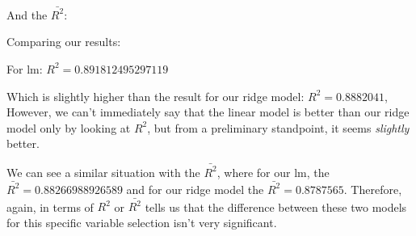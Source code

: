 \documentclass[]{article}
\newenvironment{Shaded}{\begin{snugshade}}{\end{snugshade}}
\newcommand{\CommentTok}[1]{\textcolor[rgb]{0.56,0.35,0.01}{\textit{#1}}}
\newcommand{\DecValTok}[1]{\textcolor[rgb]{0.00,0.00,0.81}{#1}}
\newcommand{\KeywordTok}[1]{\textcolor[rgb]{0.13,0.29,0.53}{\textbf{#1}}}
\newcommand{\NormalTok}[1]{#1}
\newcommand{\OperatorTok}[1]{\textcolor[rgb]{0.81,0.36,0.00}{\textbf{#1}}}
\newcommand{\StringTok}[1]{\textcolor[rgb]{0.31,0.60,0.02}{#1}}
\begin{document}
{And the \(\bar{R^2}\):

\begin{Shaded}
\end{Shaded}

Comparing our results:

For lm: \(R^2 = 0.891812495297119\)

Which is slightly higher than the result for our ridge model:
\(R^2 = 0.8882041\), However, we can't immediately say that the linear
model is better than our ridge model only by looking at \(R^2\), but
from a preliminary standpoint, it seems \emph{slightly} better.

We can see a similar situation with the \(\bar{R^2}\), where for our lm,
the \(\bar{R^2} = 0.88266988926589\) and for our ridge model the
\(\bar{R^2} = 0.8787565\). Therefore, again, in terms of \(R^2\) or
\(\bar{R^2}\) tells us that the difference between these two models for
this specific variable selection isn't very significant.
\end{document}
